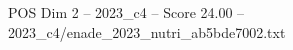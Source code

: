 \begin{textsample}{POS Dim 2 – 2023\_c4 – Score 24.00 – 2023\_c4/enade\_2023\_nutri\_ab5bde7002.txt}
\end{textsample}
